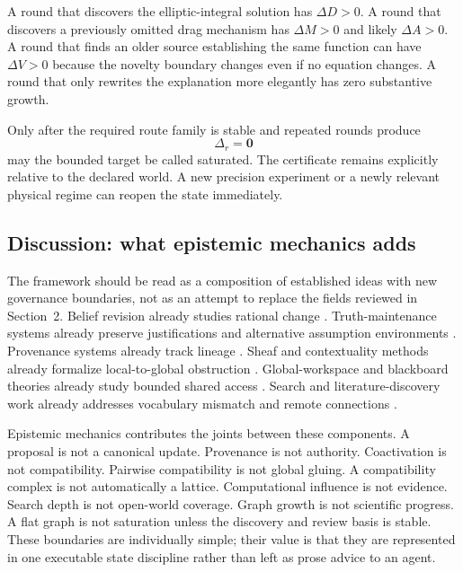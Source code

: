 \documentclass[11pt]{article}
\begin{document}
A round that discovers the elliptic-integral solution has \(\Delta D>0\). A round that discovers a previously omitted drag mechanism has \(\Delta M>0\) and likely \(\Delta A>0\). A round that finds an older source establishing the same function can have \(\Delta V>0\) because the novelty boundary changes even if no equation changes. A round that only rewrites the explanation more elegantly has zero substantive growth.

Only after the required route family is stable and repeated rounds produce
\[
\Delta_r=\mathbf0
\]
may the bounded target be called saturated. The certificate remains explicitly relative to the declared world. A new precision experiment or a newly relevant physical regime can reopen the state immediately.

\subsection{Discussion: what epistemic mechanics adds}

The framework should be read as a composition of established ideas with new governance boundaries, not as an attempt to replace the fields reviewed in Section~2. Belief revision already studies rational change \cite{agm1985,gardenfors1988}. Truth-maintenance systems already preserve justifications and alternative assumption environments \cite{doyle1979,dekleer1986}. Provenance systems already track lineage \cite{buneman2001,green2007,prov2013}. Sheaf and contextuality methods already formalize local-to-global obstruction \cite{abramsky2011,curry2014}. Global-workspace and blackboard theories already study bounded shared access \cite{hayesroth1985,nii1986,baars1988,dehaene2001}. Search and literature-discovery work already addresses vocabulary mismatch and remote connections \cite{furnas1987,swanson1986,garikaparthi2025}.

Epistemic mechanics contributes the joints between these components. A proposal is not a canonical update. Provenance is not authority. Coactivation is not compatibility. Pairwise compatibility is not global gluing. A compatibility complex is not automatically a lattice. Computational influence is not evidence. Search depth is not open-world coverage. Graph growth is not scientific progress. A flat graph is not saturation unless the discovery and review basis is stable. These boundaries are individually simple; their value is that they are represented in one executable state discipline rather than left as prose advice to an agent.
\end{document}
